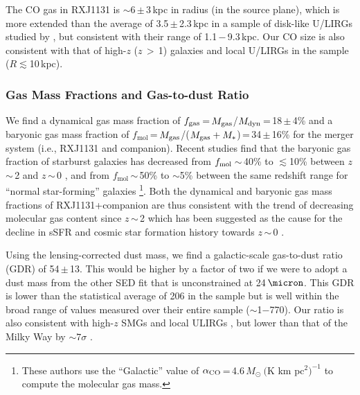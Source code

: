 \documentclass[]{emulateapj}
\newcommand{\alphaco}{\mbox{$\alpha_{\rm CO}$}\xspace}
\newcommand{\alphaU}{\mbox{$M_{\odot}~($K\,\,km\,\,pc$^2)^{-1}$}\xspace}
\newcommand{\eq}{\,=\,}
\newcommand{\ssim}{\,$\sim$\,}
\newcommand{\pmm}{\,$\pm$\,}
\newcommand{\SF}{star formation\xspace}
\begin{document}
The CO gas in RXJ1131 is $\sim$6\pmm3\,kpc in radius (in the source plane),
which is more
extended than the average of 3.5\pmm2.3\,kpc in a sample of disk-like U/LIRGs studied by
\citet[]{Ueda14a},
but consistent with their range of 1.1\,$-$\,9.3\,kpc.
Our CO size is also consistent with that of high-$z$
($z$\,$>$\,1) galaxies \citep[$R\sim$\,4$-$20\,kpc;
;][]{Daddi10a, Riechers11a, Ivison11a} and
local U/LIRGs in the \citet{Gao99a} sample ($R\lesssim$10\,kpc).


\subsubsection{Gas Mass Fractions and Gas-to-dust Ratio} \label{sec:frac}

We find a dynamical gas mass fraction of $f_{\rm gas}$\eq$M_{\rm gas}$/$M_{\rm dyn}$\eq18\pmm4\%
and a baryonic gas mass fraction of $f_\textrm{mol}$\eq$M_{\rm gas}$/($M_{\rm gas} + M_*$)\eq34\pmm16\% for the merger system (i.e., RXJ1131 and companion).
Recent studies find that the baryonic gas fraction of starburst galaxies has decreased from $f_{\rm mol}$\ssim40\% to $\lesssim$10\% between $z$\ssim2 and $z$\ssim0 \citep[;][]{GS04a, Tacconi06a},
and from $f_\textrm{mol}$\ssim50\% to $\sim$5\% between the same redshift range for
``normal star-forming'' galaxies \citep{Geach11a, Saintonge11a, Tacconi13a}\footnote{These authors use the ``Galactic'' value of
\alphaco\eq4.6\,\alphaU to compute the molecular gas mass.}.
Both the dynamical and baryonic gas mass fractions of RXJ1131+companion are thus consistent with the trend of decreasing molecular gas content since $z$\ssim2
which has been suggested as the cause for the decline in sSFR and cosmic \SF history towards $z$\ssim0 \citep[e.g.,][]{Tacconi13a,CW13,Genzel15a}.


Using the lensing-corrected dust mass, we find a galactic-scale
gas-to-dust ratio (GDR) of
54\pmm13.
This would be higher by a factor of two if we were to adopt a dust mass from the other SED fit that is unconstrained at 24\,$\micron$.
This GDR is lower than the statistical average of 206
in the  sample but is well within the broad
range of values measured over their entire sample ($\sim$1$-$770).
Our ratio is also consistent with high-$z$ SMGs
\citep[]{Bothwell13a} and
local ULIRGs \citep{Wilson08a}, but lower than that of the Milky Way by
$\sim 7\sigma$ \citep[ignoring systematic uncertainties;][]{Li01a,Zubko04a,Draine07a}.
\end{document}
